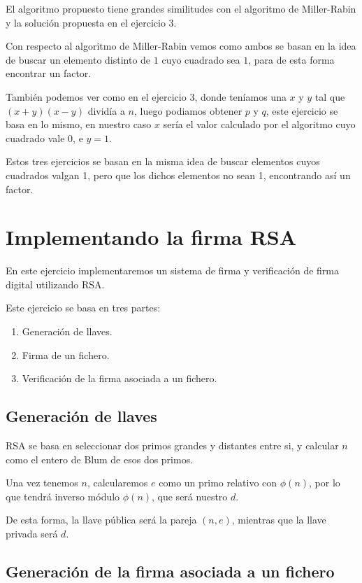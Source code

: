 \documentclass[12pt, spanish]{article}
\begin{document}
El algoritmo propuesto tiene grandes similitudes con el algoritmo de Miller-Rabin y la solución propuesta en el ejercicio 3.

Con respecto al algoritmo de Miller-Rabin vemos como ambos se basan en la idea de buscar un elemento distinto de $1$ cuyo cuadrado sea $1$, para de esta forma encontrar un factor.

También podemos ver como en el ejercicio 3, donde teníamos una $x$ y $y$  tal que $(x + y)(x - y)$ dividía a $n$, luego podiamos obtener $p$ y $q$, este ejercicio se basa en lo mismo, en nuestro caso $x$ sería el valor calculado por el algoritmo cuyo cuadrado vale 0, e $y = 1$.

Estos tres ejercicios se basan en la misma idea de buscar elementos cuyos cuadrados valgan 1, pero que los dichos elementos no sean 1, encontrando así un factor.


\section{Implementando la firma RSA}

En este ejercicio implementaremos un sistema de firma y verificación de firma digital utilizando RSA.

Este ejercicio se basa en tres partes:

\begin{enumerate}
	\item Generación de llaves.
	\item Firma de un fichero.
	\item Verificación de la firma asociada a un fichero.
\end{enumerate}

\subsection{Generación de llaves}

RSA se basa en seleccionar dos primos grandes y distantes entre si, y calcular $n$ como el entero de Blum de esos dos primos.

Una vez tenemos $n$, calcularemos $e$ como un primo relativo con $\phi(n)$, por lo que tendrá inverso módulo $\phi(n)$, que será nuestro $d$.

De esta forma, la llave pública será la pareja $(n, e)$, mientras que la llave privada será $d$.

\subsection{Generación de la firma asociada a un fichero}
\end{document}
